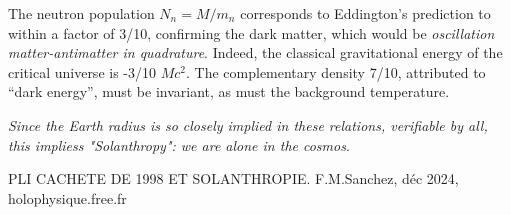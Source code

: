\documentclass[a4paper,12pt]{article}
\begin{document}
The neutron population $N_n = M/m_n$ corresponds to Eddington's prediction %
to within a factor of 3/10, confirming the dark matter, which would be \textit{oscillation matter-antimatter in quadrature}. Indeed, the classical gravitational energy of the critical universe is -3/10 $Mc^2$. The complementary density 7/10, attributed to “dark energy”, must be invariant, as must the background temperature. 

\textit{Since the Earth radius is so closely implied in these relations, verifiable by all, this impliess "Solanthropy": we are alone in the cosmos}.

%
%





PLI CACHETE DE 1998 ET SOLANTHROPIE. F.M.Sanchez, déc 2024, holophysique.free.fr
~~~~~~~~~~~~~~~~~~~~~~~~~~~~~~~~~~~~~~~~~~~~~~~~~~~~~~~~~~~~~~~~~~~~~~~~~~~~~~~~~~~~~~~~~~~~~~~~~~~~~~~~~~~~~~~~~~~~~~~~~~~~~~~~~~~~~~~~~~~~~~~~~~~~~~~~~~~~~~~~~~~~~~~~
\end{document}
